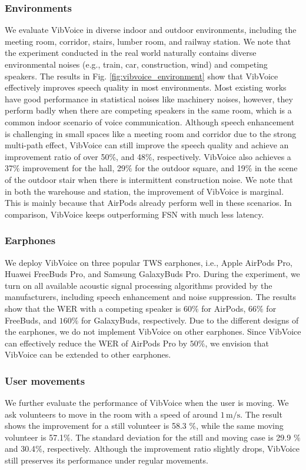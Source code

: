 \subsubsection{\textbf{Environments}}
We evaluate VibVoice in diverse indoor and outdoor environments, including the meeting room, corridor, stairs, lumber room, and railway station. 
We note that the experiment conducted in the real world naturally contains diverse environmental noises (e.g., train, car, construction, wind) and competing speakers. The results in Fig. \ref{fig:vibvoice_environment} show that VibVoice effectively improves speech quality in most environments.
Most existing works have good performance in statistical noises like machinery noises, however, they perform badly when there are competing speakers in the same room, which is a common indoor scenario of voice communication.
 Although speech enhancement is challenging in small spaces like a meeting room and corridor due to the strong multi-path effect, VibVoice can still improve the speech quality and achieve an improvement ratio of over 50\%, and 48\%, respectively. VibVoice also achieves a 37$\%$ improvement for the hall, 29$\%$ for the outdoor square, and 19\% in the scene of the outdoor stair when there is intermittent construction noise. We note that in both the warehouse and station, the improvement of VibVoice is marginal. This is mainly because that AirPods already perform well in these scenarios. In comparison, VibVoice keeps outperforming FSN with much less latency. 

\subsubsection{\textbf{Earphones}}
We deploy VibVoice on three popular TWS earphones, i.e., Apple AirPods Pro, Huawei FreeBuds Pro, and Samsung GalaxyBuds Pro. During the experiment, we turn on all available acoustic signal processing algorithms provided by the manufacturers, including speech enhancement and noise suppression.
The results show that the WER with a competing speaker is $60\%$ for AirPods, $66\%$ for FreeBuds, and $160\%$ for GalaxyBuds, respectively. Due to the different designs of the earphones, we do not implement VibVoice on other earphones. Since VibVoice can effectively reduce the WER of AirPods Pro by $50\%$, we envision that VibVoice can be extended to other earphones.

\subsubsection{\textbf{User movements}}
We further evaluate the performance of VibVoice when the user is moving. We ask volunteers to move in the room with a speed of around $1\,\text{m/s}$.  
The result shows the improvement for a still volunteer is 58.3 $\%$, while the same moving volunteer is 57.1$\%$.
The standard deviation for the still and moving case is 29.9 $\%$ and 30.4$\%$, respectively. Although the improvement ratio slightly drops, VibVoice still preserves its performance under regular movements. 

